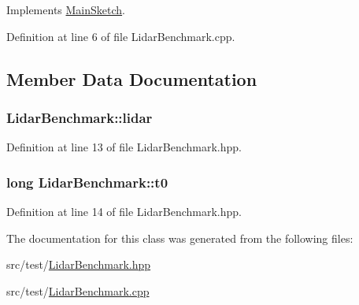 Implements \hyperlink{classMainSketch_a0708e1eb0ced1063f600f4111df90bf2}{Main\-Sketch}.



Definition at line 6 of file Lidar\-Benchmark.\-cpp.



\subsection{Member Data Documentation}
\hypertarget{classLidarBenchmark_a559db88ad7e51c4c254ce241c0361ab6}{
\subsubsection[{lidar}]{ Lidar\-Benchmark\-::lidar\hspace{0.3cm}{\ttfamily [private]}}}\label{classLidarBenchmark_a559db88ad7e51c4c254ce241c0361ab6}


Definition at line 13 of file Lidar\-Benchmark.\-hpp.

\hypertarget{classLidarBenchmark_a5527736a3831d0a04d8158748e8f2b48}{
\subsubsection[{t0}]{\setlength{\rightskip}{0pt plus 5cm}long Lidar\-Benchmark\-::t0\hspace{0.3cm}{\ttfamily [private]}}}\label{classLidarBenchmark_a5527736a3831d0a04d8158748e8f2b48}


Definition at line 14 of file Lidar\-Benchmark.\-hpp.



The documentation for this class was generated from the following files\-:\begin{DoxyCompactItemize}
\item 
src/test/\hyperlink{LidarBenchmark_8hpp}{Lidar\-Benchmark.\-hpp}\item 
src/test/\hyperlink{LidarBenchmark_8cpp}{Lidar\-Benchmark.\-cpp}\end{DoxyCompactItemize}
